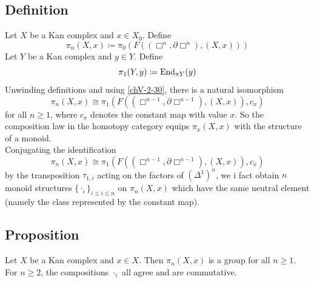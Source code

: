     \subsection{Definition}\label{chV-3-6}
        Let $X$ be a Kan complex and $x \in X_0$. Define
        \begin{equation*}
            \pi_n(X, x) \coloneq \pi_0(F((\Box^n, \partial \Box^n),(X,x)))
        \end{equation*}
        Let $Y$ be a Kan complex and $y \in Y$. Define
        \begin{equation*}
            \pi_1(Y, y) \coloneq \operatorname{End}_{\pi Y}(y)
        \end{equation*}
        Unwinding definitions and using \ref{chV-2-30}, there is a natural isomorphism
        \begin{equation*}
            \pi_n(X, x) \cong \pi_1(F((\Box^{n-1}, \partial \Box^{n-1}),(X, x)), c_x)
        \end{equation*}
        for all $n \geq 1$, where $c_x$ denotes the constant map with value $x$. So the composition law in the homotopy category equips $\pi_x(X, x)$ with the structure of a monoid.\\
        Conjugating the identification
        \begin{equation*}
            \pi_n(X, x) \cong \pi_1(F((\Box^{n-1}, \partial \Box^{n-1}),(X, x)), c_x)
        \end{equation*}
        by the transposition $\tau_{1, i}$ acting on the factors of $(\Delta^1)^n$, we i fact obtain $n$ monoid structures $\{ \cdot_i \}_{i \leq i \leq n}$ on $\pi_n(X, x)$ which have the same neutral element (namely the class represented by the constant map).

    \subsection{Proposition}\label{chV-3-7}
        Let $X$ be a Kan complex and $x \in X$. Then $\pi_n(X, x)$ is a group for all $n \geq 1$. For $n \geq 2$, the compositions $\cdot_i$ all agree and are commutative.
        \smallskip

